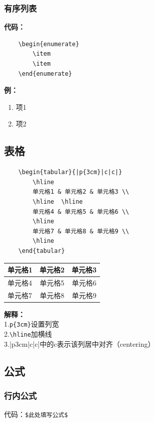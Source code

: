 \documentclass[UTF8]{ctexart}
\begin{document}
\subsubsection{有序列表} 
\textbf{代码：}
\begin{lstlisting}
    \begin{enumerate}
        \item
        \item
    \end{enumerate}
    \end{lstlisting}
\qquad \textbf{例：}
\begin{enumerate}
    \item 项1
    \item 项2
\end{enumerate}

\subsection{表格} 
\begin{lstlisting}
    \begin{tabular}{|p{3cm}|c|c|}
        \hline
        单元格1 & 单元格2 & 单元格3 \\
        \hline  \hline
        单元格4 & 单元格5 & 单元格6 \\
        \hline
        单元格7 & 单元格8 & 单元格9 \\
        \hline
    \end{tabular}
\end{lstlisting}
\begin{tabular}{|p{3cm}|c|c|}
    \hline
    单元格1 & 单元格2 & 单元格3 \\
    \hline  \hline
    单元格4 & 单元格5 & 单元格6 \\
    \hline
    单元格7 & 单元格8 & 单元格9 \\
    \hline
\end{tabular}\bigskip

\textbf{解释：}\\
1.\verb|p{3cm}|设置列宽\\
2.\verb|\hline|加横线\\
3.|p{3cm}|c|c|中的c表示该列居中对齐（centering）



\subsection{公式}
\subsubsection{行内公式}
代码：\verb|$此处填写公式$|
\end{document}
